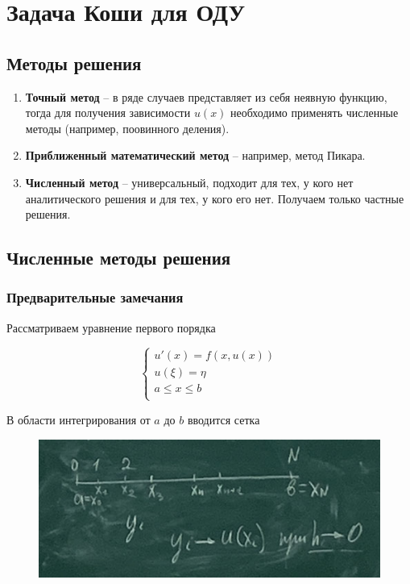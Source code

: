 \section{Задача Коши для ОДУ}

\subsection{Методы решения}

\begin{enumerate}
    \item \textbf{Точный метод} --
        в ряде случаев представляет из себя неявную функцию, тогда
        для получения зависимости $u(x)$ необходимо применять
        численные методы (например, поовинного деления).
    \item \textbf{Приближенный математический метод} --
        например, метод Пикара.
    \item \textbf{Численный метод} --
        универсальный, подходит для тех, у кого нет аналитического
        решения и для тех, у кого его нет. Получаем только
        частные решения.
\end{enumerate}

\subsection{Численные методы решения}

\subsubsection{Предварительные замечания}

Рассматриваем уравнение первого порядка

\begin{equation*}
    \begin{cases}
        u'(x) = f(x, u(x)) \\
        u(\xi) = \eta \\
        a \le x \le b \\
    \end{cases}
\end{equation*}

В области интегрирования от $a$ до $b$ вводится сетка

\begin{figure}[H]
    \centering
    \includegraphics[scale=0.8]{img/grid.jpg}
\end{figure}


